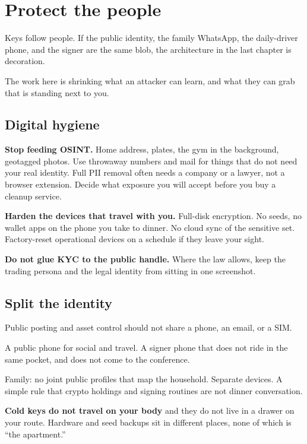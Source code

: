 \chapter{Protect the people}

Keys follow people. If the public identity, the family
WhatsApp, the daily-driver phone, and the signer are the
same blob, the architecture in the last chapter is
decoration.

The work here is shrinking what an attacker can learn,
and what they can grab that is standing next to you.

\section{Digital hygiene}

\textbf{Stop feeding OSINT.} Home address, plates, the
gym in the background, geotagged photos. Use throwaway
numbers and mail for things that do not need your real
identity. Full PII removal often needs a company or a
lawyer, not a browser extension. Decide what exposure you
will accept before you buy a cleanup service.

\textbf{Harden the devices that travel with you.}
Full-disk encryption. No seeds, no wallet apps on the
phone you take to dinner. No cloud sync of the sensitive
set. Factory-reset operational devices on a schedule if
they leave your sight.

\textbf{Do not glue KYC to the public handle.} Where the
law allows, keep the trading persona and the legal
identity from sitting in one screenshot.

\section{Split the identity}

Public posting and asset control should not share a
phone, an email, or a SIM.

A public phone for social and travel. A signer phone that
does not ride in the same pocket, and does not come to
the conference.

Family: no joint public profiles that map the household.
Separate devices. A simple rule that crypto holdings and
signing routines are not dinner conversation.

\textbf{Cold keys do not travel on your body} and they do
not live in a drawer on your route. Hardware and seed
backups sit in different places, none of which is ``the
apartment.''

